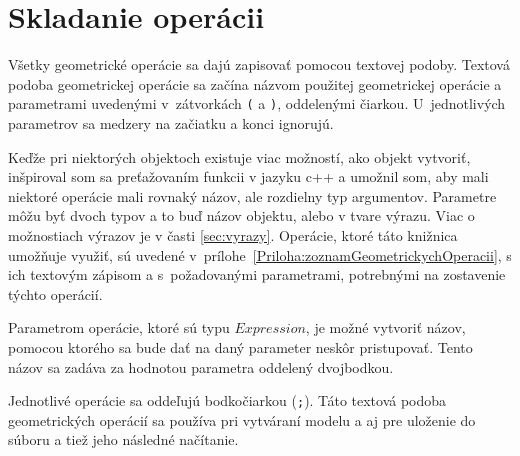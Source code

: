 



\section{Skladanie operácii }
\label{sec:skladanie}
Všetky geometrické operácie sa dajú zapisovať pomocou textovej podoby. 
Textová podoba geometrickej operácie sa začína názvom použitej geometrickej operácie a parametrami uvedenými v~zátvorkách \texttt{(} a \texttt{)}, oddelenými čiarkou. U~jednotlivých parametrov sa medzery na začiatku a konci ignorujú.

 Keďže pri niektorých objektoch existuje viac možností, ako objekt vytvoriť, inšpiroval som sa preťažovaním funkcii v jazyku c++ a umožnil som, aby mali niektoré operácie mali rovnaký názov, ale rozdielny typ argumentov. Parametre môžu byť dvoch typov a to buď názov objektu, alebo v tvare výrazu. Viac o možnostiach výrazov je v časti \ref{sec:vyrazy}. Operácie, ktoré táto knižnica umožňuje využiť, sú uvedené v~prílohe~\ref{Priloha:zoznamGeometrickychOperacii}, s ich textovým zápisom a s~požadovanými parametrami, potrebnými na zostavenie týchto operácií.

Parametrom operácie, ktoré sú typu $Expression$, je možné vytvoriť názov, pomocou ktorého sa bude dať na daný parameter neskôr pristupovať. 
Tento názov sa zadáva za hodnotou parametra oddelený dvojbodkou.

Jednotlivé operácie sa oddeľujú bodkočiarkou (\texttt{;}). 
Táto textová podoba geometrických operácií sa používa pri vytváraní modelu a aj pre uloženie do súboru a tiež jeho následné načítanie.

